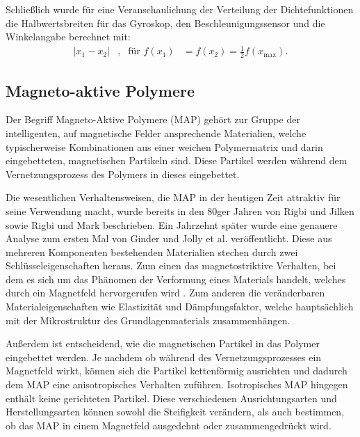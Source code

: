 Schließlich wurde für eine Veranschaulichung der Verteilung der Dichtefunktionen die Halbwertsbreiten für das Gyroskop, den Beschleunigungssensor und die Winkelangabe berechnet mit:
\begin{align}
	|x_1 - x_2|&, & \text{für } f(x_1)&=f(x_2)=\frac{1}{2}f(x_\text{max}).
\end{align}


\FloatBarrier

\subsection{Magneto-aktive Polymere}\label{kap_MAP}
Der Begriff Magneto-Aktive Polymere (MAP) gehört zur Gruppe der intelligenten, auf magnetische Felder ansprechende Materialien, welche typischerweise Kombinationen aus einer weichen Polymermatrix und darin eingebetteten, magnetischen Partikeln sind. Diese Partikel werden während dem Vernetzungsprozess des Polymers in dieses eingebettet. 

Die wesentlichen Verhaltensweisen, die MAP in der heutigen Zeit attraktiv für seine Verwendung macht, wurde bereits in den 80ger Jahren von Rigbi und Jilken \cite{Rigbi1} sowie Rigbi und Mark \cite{Rigbi2} beschrieben. Ein Jahrzehnt später wurde eine genauere Analyse zum ersten Mal von Ginder und Jolly et al. \cite{ginder} veröffentlicht. 
Diese aus mehreren Komponenten bestehenden Materialien stechen durch zwei Schlüsseleigenschaften heraus. 
Zum einen das magnetostriktive Verhalten, bei dem es sich um das Phänomen der Verformung eines Materials handelt, welches durch ein Magnetfeld hervorgerufen wird \cite{Martin_2006}.
Zum anderen die veränderbaren Materialeigenschaften wie Elastizität und Dämpfungsfaktor, welche hauptsächlich mit der Mikrostruktur des Grundlagenmaterials zusammenhängen. \cite{Varga1} \cite{Varga2}

Außerdem ist entscheidend, wie die magnetischen Partikel in das Polymer eingebettet werden. Je nachdem ob während des Vernetzungsprozesses ein Magnetfeld wirkt, können sich die Partikel kettenförmig ausrichten und dadurch dem MAP eine anisotropisches Verhalten zuführen. Isotropisches MAP hingegen enthält keine gerichteten Partikel. Diese verschiedenen Ausrichtungsarten und Herstellungsarten können sowohl die Steifigkeit verändern, als auch bestimmen, ob das MAP in einem Magnetfeld ausgedehnt oder zusammengedrückt wird. 

